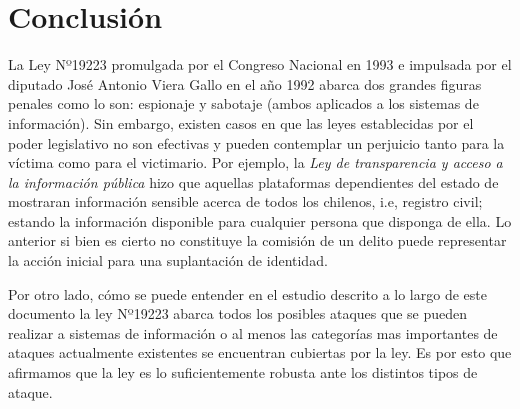 \chapter{Conclusión}
\label{chap:conclusion}

La Ley Nº19223 promulgada por el Congreso Nacional en 1993 e impulsada por el diputado José Antonio Viera Gallo en el año 1992 abarca dos grandes figuras penales como lo son: espionaje y sabotaje (ambos aplicados a los sistemas de información). Sin embargo, existen casos en que las leyes establecidas por el poder legislativo no son efectivas y pueden contemplar un perjuicio tanto para la víctima como para el victimario. Por ejemplo, la \textit{Ley de transparencia y acceso a la información pública} hizo que aquellas plataformas dependientes del estado de mostraran información sensible acerca de todos los chilenos, i.e, registro civil; estando la información disponible para cualquier persona que disponga de ella. Lo anterior si bien es cierto no constituye la comisión de un delito puede representar la acción inicial para una suplantación de identidad.


Por otro lado, cómo se puede entender en el estudio descrito a lo largo de este documento la ley Nº19223 abarca todos los posibles ataques que se pueden realizar a sistemas de información o al menos las categorías mas importantes de ataques actualmente existentes se encuentran cubiertas por la ley. Es por esto que afirmamos que la ley es lo suficientemente robusta ante los distintos tipos de ataque.


